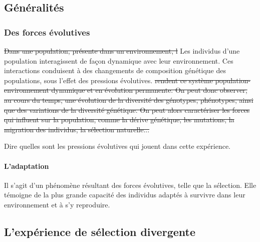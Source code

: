 \documentclass[12pt,a4paper]{report}
\newcommand{\com}[1]{{\noindent  \color{red}#1}}
\begin{document}
			\subsection{Généralités}
				
				\subsubsection{Des forces évolutives}
				
					\sout{Dans une population, présente dans un environnement, l} \com{L}es individus \com{d'une population} interagissent de façon dynamique avec leur environnement. Ces interactions \com{conduisent à des changements de composition génétique des populations, sous l'effet des pressions évolutives.} \sout{rendent ce système population-environnement dynamique et en évolution permanente. On peut donc observer, au cours du temps, une évolution de la diversité des génotypes, phénotypes, ainsi que des variations de la diversité génétique. On peut alors caractériser les forces qui influent sur la population, comme la dérive génétique, les mutations, la migration des individus, la sélection naturelle...} %
					
\com{Dire quelles sont les pressions évolutives qui jouent dans cette expérience.}					
					
				\paragraph{L'adaptation}
				
					Il s'agit d'un phénomène résultant des forces évolutives, telle que la sélection. Elle témoigne de la plus grande capacité des individus adaptés à survivre dans leur environnement et à s'y reproduire.
			
			\subsection{L'expérience de sélection divergente}
			
\end{document}
